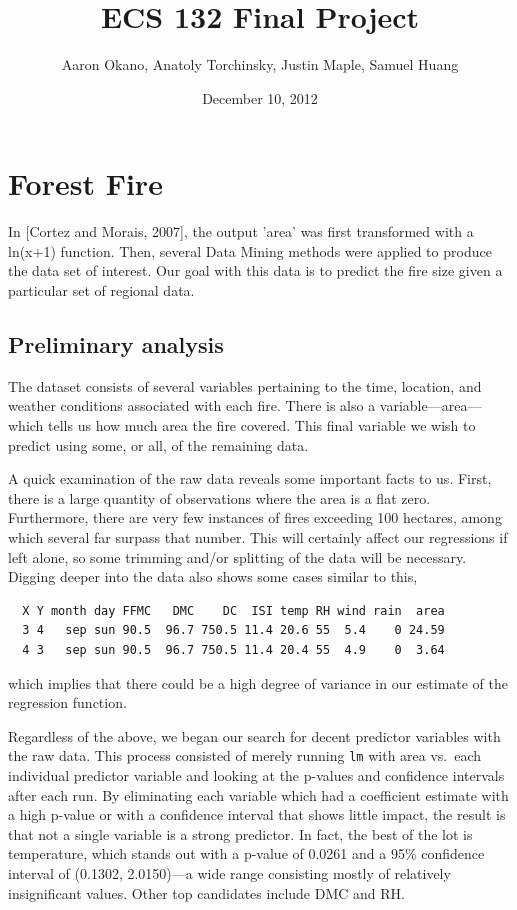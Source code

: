 \documentclass{article}
\title{ECS 132 Final Project}  %
\author{Aaron Okano, Anatoly Torchinsky, Justin Maple, Samuel Huang }    %
\date{December 10, 2012}   %
\begin{document}

\maketitle                 %



\section{Forest Fire}

In [Cortez and Morais, 2007], the output 'area' was first transformed with a ln(x+1) function. 
Then, several Data Mining methods were applied to produce the data set of interest. Our goal with
this data is to predict the fire size given a particular set of regional data.

\subsection{Preliminary analysis}

The dataset consists of several variables pertaining to the time, location, and
weather conditions associated with each fire. There is also a
variable---area---which tells us how much area the fire covered. This final
variable we wish to predict using some, or all, of the remaining data.

A quick examination of the raw data reveals some important facts to us. First,
there is a large quantity of observations where the area is a flat zero.
Furthermore, there are very few instances of fires exceeding 100 hectares,
among which several far surpass that number. This will certainly affect our
regressions if left alone, so some trimming and/or splitting of the data will
be necessary. Digging deeper into the data also shows some cases similar to
this,
\begin{verbatim}
  X Y month day FFMC   DMC    DC  ISI temp RH wind rain  area
  3 4   sep sun 90.5  96.7 750.5 11.4 20.6 55  5.4    0 24.59
  4 3   sep sun 90.5  96.7 750.5 11.4 20.4 55  4.9    0  3.64
\end{verbatim}
which implies that there could be a high degree of variance in our estimate of
the regression function.

Regardless of the above, we began our search for decent predictor variables
with the raw data. This process consisted of merely running \verb=lm= with area
vs.\ each individual predictor variable and looking at the p-values and
confidence intervals after each run. By eliminating each variable which had a
coefficient estimate with a high p-value or with a confidence interval that
shows little impact, the result is that not a single variable is a strong
predictor. In fact, the best of the lot is temperature, which stands out with a
p-value of 0.0261 and a 95\% confidence interval of (0.1302, 2.0150)---a
wide range consisting mostly of relatively insignificant values. Other top
candidates include DMC and RH.
\end{document}
